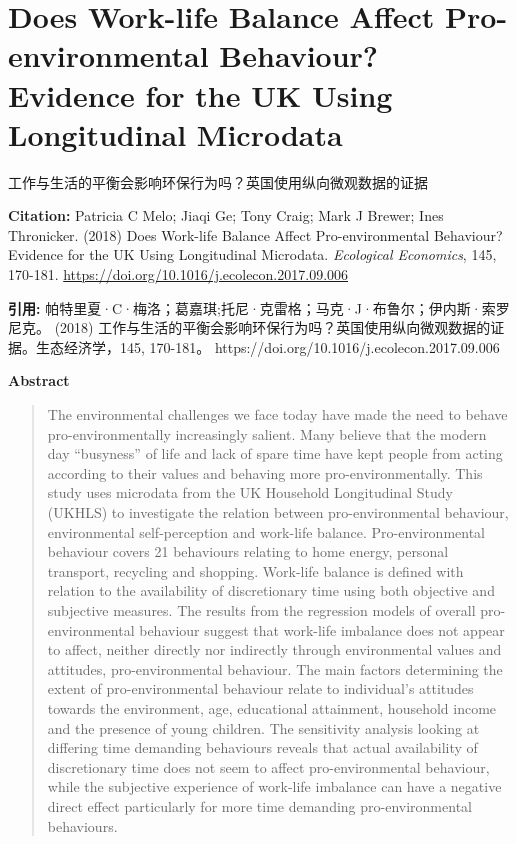 \vspace{0.5em}
\chapter{Does Work-life Balance Affect Pro-environmental Behaviour? Evidence for the UK Using Longitudinal Microdata}
\begin{center}\small 工作与生活的平衡会影响环保行为吗？英国使用纵向微观数据的证据\end{center}

\noindent\textbf{Citation:} Patricia C Melo; Jiaqi Ge; Tony Craig; Mark J Brewer; Ines Thronicker. (2018) Does Work-life Balance Affect Pro-environmental Behaviour? Evidence for the UK Using Longitudinal Microdata. \textit{Ecological Economics}, 145, 170-181. \url{https://doi.org/10.1016/j.ecolecon.2017.09.006}

\vspace{0.5em}
\noindent\textbf{引用:} 帕特里夏·C·梅洛；葛嘉琪;托尼·克雷格；马克·J·布鲁尔；伊内斯·索罗尼克。 (2018) 工作与生活的平衡会影响环保行为吗？英国使用纵向微观数据的证据。生态经济学，145, 170-181。 https://doi.org/10.1016/j.ecolecon.2017.09.006

\vspace{1.5em}
\noindent\textbf{Abstract}\par
\begin{quote}\small
The environmental challenges we face today have made the need to behave pro-environmentally increasingly salient. Many believe that the modern day “busyness” of life and lack of spare time have kept people from acting according to their values and behaving more pro-environmentally. This study uses microdata from the UK Household Longitudinal Study (UKHLS) to investigate the relation between pro-environmental behaviour, environmental self-perception and work-life balance. Pro-environmental behaviour covers 21 behaviours relating to home energy, personal transport, recycling and shopping. Work-life balance is defined with relation to the availability of discretionary time using both objective and subjective measures. The results from the regression models of overall pro-environmental behaviour suggest that work-life imbalance does not appear to affect, neither directly nor indirectly through environmental values and attitudes, pro-environmental behaviour. The main factors determining the extent of pro-environmental behaviour relate to individual's attitudes towards the environment, age, educational attainment, household income and the presence of young children. The sensitivity analysis looking at differing time demanding behaviours reveals that actual availability of discretionary time does not seem to affect pro-environmental behaviour, while the subjective experience of work-life imbalance can have a negative direct effect particularly for more time demanding pro-environmental behaviours.
\end{quote}

